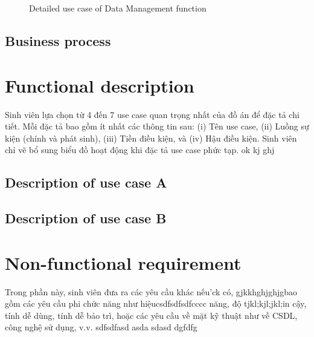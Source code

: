 \documentclass[../Main.tex]{subfiles}
\begin{document}
\begin{figure}[htbp]
  \centering
  \caption{Detailed use case of Data Management function}
  \label{fig:usecasediagram}
\end{figure}

\subsection{Business process}
\label{subsection:2.2.3}


\section{Functional description}
\label{section:2.3}
Sinh viên lựa chọn từ 4 đến 7 use case quan trọng nhất của đồ án để đặc tả chi tiết. Mỗi đặc tả bao gồm ít nhất các thông tin sau: (i) Tên use case, (ii) Luồng sự kiện (chính và phát sinh), (iii) Tiền điều kiện, và (iv) Hậu điều kiện. Sinh viên chỉ vẽ bổ sung biểu đồ hoạt động khi đặc tả use case phức tạp. ok kj ghj
\subsection{Description of use case A}
\hfill
\subsection{Description of use case B}
\hfill

\section{Non-functional requirement}
\label{section:2.4}
Trong phần này, sinh viên đưa ra các yêu cầu khác nếu'ck có, gjkkhghjghjgbao gồm các yêu cầu phi chức năng như hiệucsdfsdfsdfcccc năng, độ tjkl;kjl;jkl;in cậy, tính dễ dùng, tính dễ bảo trì, hoặc các yêu cầu về mặt kỹ thuật như về CSDL, công nghệ sử dụng, v.v.
sdfsdfasd asda sdasd dgfdfg

\end{document}
